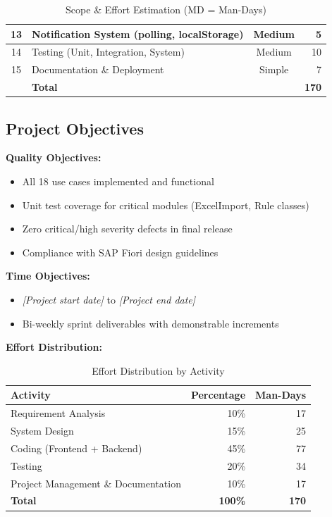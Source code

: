 \documentclass[12pt,a4paper]{report}
\newcommand{\placeholder}[1]{\textcolor{placeholderblue}{\textit{[#1]}}}
\begin{document}
\begin{table}[H]
\begin{tabularx}{\textwidth}{|c|X|c|r|}
  13 & Notification System (polling, localStorage)              & Medium  &  5 \\ \hline
  14 & Testing (Unit, Integration, System)                      & Medium  & 10 \\ \hline
  15 & Documentation \& Deployment                              & Simple  &  7 \\ \hline
  \rowcolor{tableheadpeach}
     & \textbf{Total}                                          &         & \textbf{170} \\ \hline
\end{tabularx}
\caption{Scope \& Effort Estimation (MD = Man-Days)}
\label{tab:scope-estimation}
\end{table}


\subsection{Project Objectives}

\textbf{Quality Objectives:}
\begin{itemize}[leftmargin=2em]
  \item All 18 use cases implemented and functional
  \item Unit test coverage for critical modules (ExcelImport, Rule classes)
  \item Zero critical/high severity defects in final release
  \item Compliance with SAP Fiori design guidelines
\end{itemize}

\textbf{Time Objectives:}
\begin{itemize}[leftmargin=2em]
  \item \placeholder{Project start date} to \placeholder{Project end date}
  \item Bi-weekly sprint deliverables with demonstrable increments
\end{itemize}

\textbf{Effort Distribution:}

\begin{table}[H]
\centering\small
\begin{tabular}{|l|r|r|}
  \hline
  \rowcolor{tableheadpeach}
  \textbf{Activity} & \textbf{Percentage} & \textbf{Man-Days} \\ \hline
  Requirement Analysis                 & 10\% & 17 \\ \hline
  System Design                        & 15\% & 25 \\ \hline
  Coding (Frontend + Backend)          & 45\% & 77 \\ \hline
  Testing                              & 20\% & 34 \\ \hline
  Project Management \& Documentation  & 10\% & 17 \\ \hline
  \rowcolor{tableheadpeach}
  \textbf{Total}                       & \textbf{100\%} & \textbf{170} \\ \hline
\end{tabular}
\caption{Effort Distribution by Activity}
\label{tab:effort-distribution}
\end{table}
\end{document}
